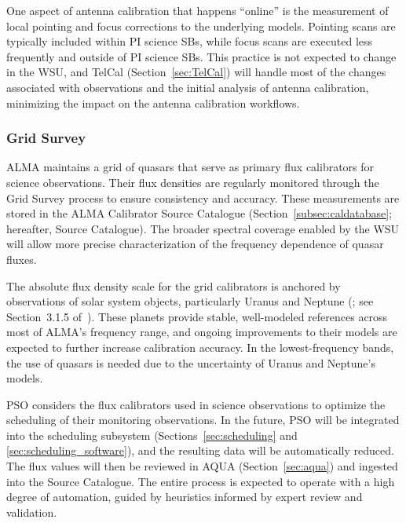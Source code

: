 One aspect of antenna calibration that happens ``online'' is the measurement of local pointing and focus corrections to the underlying models. Pointing scans are typically
included within PI science SBs, while focus scans are executed less frequently and outside of PI science SBs.  This practice is not expected to change in the WSU, and \ac{TelCal} (Section~\ref{sec:TelCal}) will handle most of the changes associated with observations and the initial analysis of antenna calibration, minimizing the impact on the antenna calibration workflows.


\subsubsection{Grid Survey} 
\label{sec:gridsurvey}

ALMA maintains a grid of quasars that serve as primary flux calibrators for science observations. Their flux densities are regularly monitored through the Grid Survey process to ensure consistency and accuracy. These measurements are stored in the ALMA Calibrator Source Catalogue (Section~\ref{subsec:caldatabase}; hereafter, Source Catalogue). The broader spectral coverage enabled by the WSU will allow more precise characterization of the frequency dependence of quasar fluxes.

The absolute flux density scale for the grid calibrators is anchored by observations of solar system objects, particularly Uranus and Neptune (\cite{c12_thb, Farren2021}; see Section~3.1.5 of~\cite{CSA-IA}). These planets provide stable, well-modeled references across most of ALMA’s frequency range, and ongoing improvements to their models are expected to further increase calibration accuracy. In the lowest-frequency bands, the use of quasars is needed due to the uncertainty of Uranus and Neptune's models.


\ac{PSO} considers the flux calibrators used in science observations to optimize the scheduling of their monitoring observations. In the future, \ac{PSO} will be integrated into the scheduling subsystem (Sections~\ref{sec:scheduling} and \ref{sec:scheduling_software}), and the resulting data will be automatically reduced. The flux values will then be reviewed in AQUA (Section~\ref{sec:aqua}) and ingested into the Source Catalogue. The entire process is expected to operate with a high degree of automation, guided by heuristics informed by expert review and validation.

